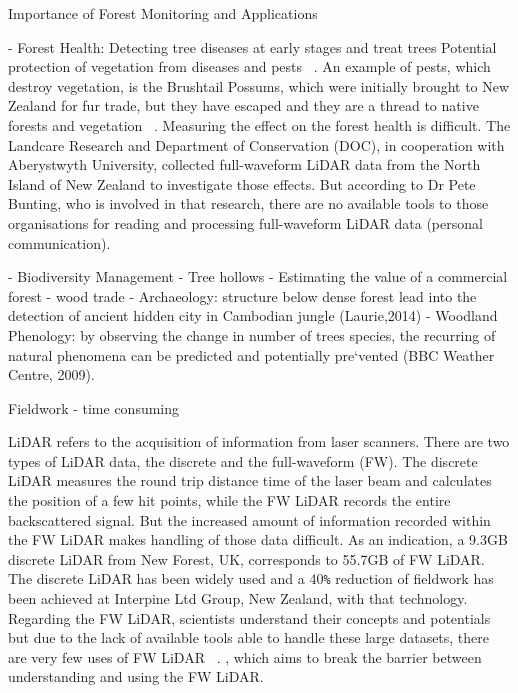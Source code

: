 \documentclass{subfiles}
\begin{document}
Importance of Forest Monitoring and Applications

 - Forest Health: Detecting tree diseases at early stages and treat trees 
 Potential protection of vegetation from diseases and pests ~\cite{ForestryCommision2014}.  
 An example of pests, which destroy vegetation, is the Brushtail Possums, which were initially brought to New Zealand for fur trade, but they have escaped and they are a thread to native forests and vegetation ~\cite{DepartementOfConversation2014}. Measuring the effect on the forest health is difficult. The Landcare Research and Department of Conservation (DOC), in cooperation with Aberystwyth University, collected full-waveform LiDAR data from the North Island of New Zealand to investigate those effects. But according to Dr Pete Bunting, who is involved in that research, there are no available tools to those organisations for reading and processing full-waveform LiDAR data (personal communication). 
 
 - Biodiversity Management - Tree hollows 
 - Estimating the value of a commercial forest - wood trade
 - Archaeology: structure below dense forest lead into the detection of ancient hidden city in Cambodian jungle (Laurie,2014)
 - Woodland Phenology: by observing the change in number of trees species, the recurring of natural phenomena can be predicted and potentially pre`vented (BBC Weather Centre, 2009). 
 
 
 
Fieldwork - time consuming



\par LiDAR refers to the acquisition of information from laser scanners. There are two types of LiDAR data, the discrete and the full-waveform (FW). The discrete LiDAR measures the round trip distance time of the laser beam and calculates the position of a few hit points, while the FW LiDAR records the entire backscattered signal. But the increased amount of information recorded within the FW LiDAR makes handling of those data difficult. As an indication, a 9.3GB discrete LiDAR from New Forest, UK, corresponds to 55.7GB of FW LiDAR. The discrete LiDAR has been widely used and a 40\verb|%| reduction of fieldwork has been achieved at Interpine Ltd Group, New Zealand, with that technology. Regarding the FW LiDAR, scientists understand their concepts and potentials but due to the lack of available tools able to handle these large datasets, there are very few uses of FW LiDAR ~\cite{Anderson2015}.
, which aims to break the barrier between understanding and using the FW LiDAR.
\end{document}
